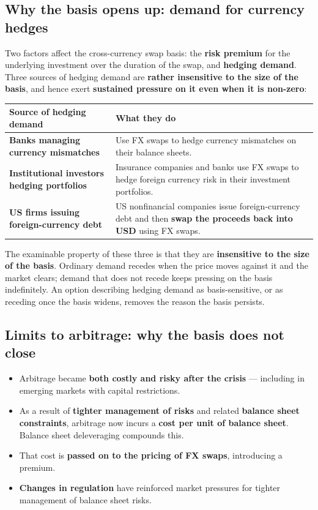 \subsection{Why the basis opens up: demand for currency hedges}

Two factors affect the cross-currency swap basis: the \textbf{risk premium} for the underlying investment over the duration of the swap, and \textbf{hedging demand}. Three sources of hedging demand are \textbf{rather insensitive to the size of the basis}, and hence exert \textbf{sustained pressure on it even when it is non-zero}:

\begin{center}
\small
\begin{tabularx}{\textwidth}{@{}p{4.8cm} X@{}}
\toprule
\rowcolor{FRMSoft}\textbf{Source of hedging demand} & \textbf{What they do} \\
\midrule
\textbf{Banks managing currency mismatches} & Use FX swaps to hedge currency mismatches on their balance sheets. \\
\addlinespace
\textbf{Institutional investors hedging portfolios} & Insurance companies and banks use FX swaps to hedge foreign currency risk in their investment portfolios. \\
\addlinespace
\textbf{US firms issuing foreign-currency debt} & US nonfinancial companies issue foreign-currency debt and then \textbf{swap the proceeds back into USD} using FX swaps. \\
\bottomrule
\end{tabularx}
\end{center}

\begin{lrtrapbox}
The examinable property of these three is that they are \textbf{insensitive to the size of the basis}. Ordinary demand recedes when the price moves against it and the market clears; demand that does not recede keeps pressing on the basis indefinitely. An option describing hedging demand as basis-sensitive, or as receding once the basis widens, removes the reason the basis persists.
\end{lrtrapbox}

\subsection{Limits to arbitrage: why the basis does not close}

\begin{itemize}
\item Arbitrage became \textbf{both costly and risky after the crisis} --- including in emerging markets with capital restrictions.
\item As a result of \textbf{tighter management of risks} and related \textbf{balance sheet constraints}, arbitrage now incurs a \textbf{cost per unit of balance sheet}. Balance sheet deleveraging compounds this.
\item That cost is \textbf{passed on to the pricing of FX swaps}, introducing a premium.
\item \textbf{Changes in regulation} have reinforced market pressures for tighter management of balance sheet risks.
\end{itemize}

